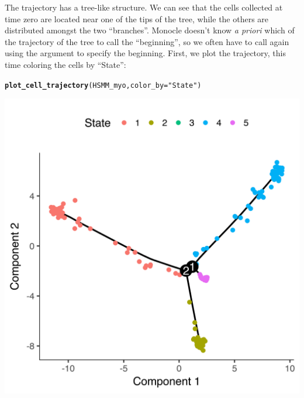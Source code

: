 \documentclass[10pt,oneside]{article}\usepackage[]{graphicx}\usepackage[]{color}
\makeatletter
\def\maxwidth{ %
  \ifdim\Gin@nat@width>\linewidth
    \linewidth
  \else
    \Gin@nat@width
  \fi
}
\newcommand{\hlstr}[1]{\textcolor[rgb]{0.192,0.494,0.8}{#1}}%
\newcommand{\hlstd}[1]{\textcolor[rgb]{0.345,0.345,0.345}{#1}}%
\newcommand{\hlkwc}[1]{\textcolor[rgb]{0.333,0.667,0.333}{#1}}%
\newcommand{\hlkwd}[1]{\textcolor[rgb]{0.737,0.353,0.396}{\textbf{#1}}}%
\newenvironment{kframe}{%
 \def\at@end@of@kframe{}%
 \ifinner\ifhmode%
  \def\at@end@of@kframe{\end{minipage}}%
  \begin{minipage}{\columnwidth}%
 \fi\fi%
 \def\FrameCommand##1{\hskip\@totalleftmargin \hskip-\fboxsep
 \colorbox{shadecolor}{##1}\hskip-\fboxsep
     \hskip-\linewidth \hskip-\@totalleftmargin \hskip\columnwidth}%
 \MakeFramed {\advance\hsize-\width
   \@totalleftmargin\z@ \linewidth\hsize
   \@setminipage}}%
 {\par\unskip\endMakeFramed%
 \at@end@of@kframe}
\newenvironment{knitrout}{}{} %
\makeatother
\begin{document}
 The trajectory has a tree-like structure. We can see that the cells 
 collected at time zero are located near one of the tips of the tree, while the 
 others are distributed amongst the two ``branches''.  Monocle doesn't know
 \emph{a priori} which of the trajectory of the tree to call the ``beginning'',
 so we often have to call  again using the 
  argument to specify the beginning. First, we plot the
 trajectory, this time coloring the cells by ``State'':
 
\begin{knitrout}
\color{fgcolor}\begin{kframe}
\begin{alltt}
\hlkwd{plot_cell_trajectory}\hlstd{(HSMM_myo,} \hlkwc{color_by}\hlstd{=}\hlstr{"State"}\hlstd{)}
\end{alltt}
\end{kframe}

{\centering \includegraphics[width=\maxwidth]{figure/plot_ordering_mst_by_state-1} 

}



\end{knitrout}
\end{document}
